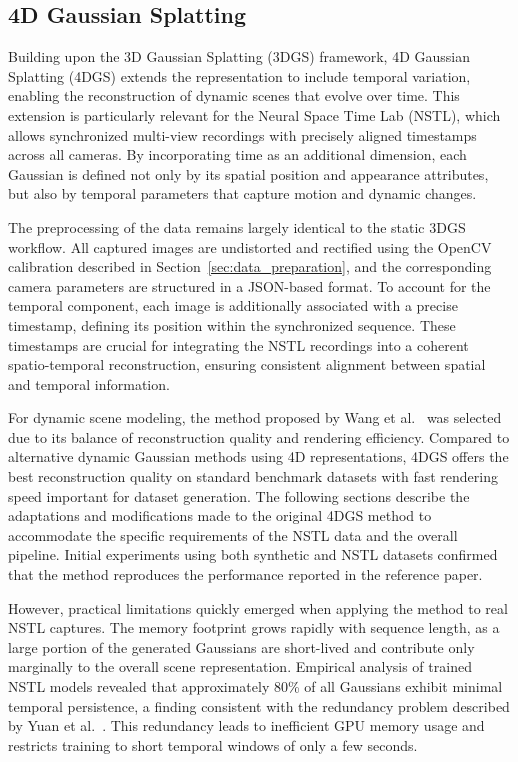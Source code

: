 \subsection{4D Gaussian Splatting}
\label{sec:4dgs}

Building upon the 3D Gaussian Splatting (3DGS) framework, 4D Gaussian Splatting (4DGS) extends the representation to include temporal variation, enabling the reconstruction of dynamic scenes that evolve over time. 
This extension is particularly relevant for the Neural Space Time Lab (NSTL), which allows synchronized multi-view recordings with precisely aligned timestamps across all cameras. 
By incorporating time as an additional dimension, each Gaussian is defined not only by its spatial position and appearance attributes, but also by temporal parameters that capture motion and dynamic changes.

The preprocessing of the data remains largely identical to the static 3DGS workflow. 
All captured images are undistorted and rectified using the OpenCV calibration described in Section~\ref{sec:data_preparation}, and the corresponding camera parameters are structured in a JSON-based format. 
To account for the temporal component, each image is additionally associated with a precise timestamp, defining its position within the synchronized sequence. 
These timestamps are crucial for integrating the NSTL recordings into a coherent spatio-temporal reconstruction, ensuring consistent alignment between spatial and temporal information.

For dynamic scene modeling, the method proposed by Wang et al.~\cite{yang20244dgs} was selected due to its balance of reconstruction quality and rendering efficiency. 
Compared to alternative dynamic Gaussian methods using 4D representations, 4DGS offers the best reconstruction quality on standard benchmark datasets with fast rendering speed important for dataset generation.
The following sections describe the adaptations and modifications made to the original 4DGS method to accommodate the specific requirements of the NSTL data and the overall pipeline.
Initial experiments using both synthetic and NSTL datasets confirmed that the method reproduces the performance reported in the reference paper.

However, practical limitations quickly emerged when applying the method to real NSTL captures. 
The memory footprint grows rapidly with sequence length, as a large portion of the generated Gaussians are short-lived and contribute only marginally to the overall scene representation. 
Empirical analysis of trained NSTL models revealed that approximately 80\% of all Gaussians exhibit minimal temporal persistence, a finding consistent with the redundancy problem described by Yuan et al.~\cite{yuan20251000fps4dgaussian}. 
This redundancy leads to inefficient GPU memory usage and restricts training to short temporal windows of only a few seconds.

